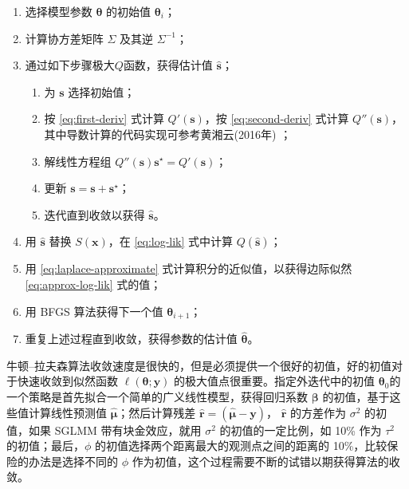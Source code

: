 \documentclass[12pt,a4paper,UTF8,twoside]{book}
\providecommand{\tightlist}{%
  \setlength{\itemsep}{0pt}\setlength{\parskip}{0pt}}
\theoremstyle{definition}
\theoremstyle{definition}
\theoremstyle{definition}
\theoremstyle{remark}
\begin{document}
\begin{enumerate}
\def\labelenumi{\arabic{enumi}.}
\tightlist
\item
  选择模型参数 \(\boldsymbol{\theta}\) 的初始值
  \(\boldsymbol{\theta}_{i}\)；
\item
  计算协方差矩阵 \(\Sigma\) 及其逆 \(\Sigma^{-1}\)；
\item
  通过如下步骤极大\(Q\)函数，获得估计值 \(\hat{\mathbf{s}}\)；

  \begin{enumerate}
  \def\labelenumii{(\alph{enumii})}
  \tightlist
  \item
    为 \(\mathbf{s}\) 选择初始值；
  \item
    按 \eqref{eq:first-deriv} 式计算 \(Q'(\mathbf{s})\)，按
    \eqref{eq:second-deriv} 式计算
    \(Q''(\mathbf{s})\)，其中导数计算的代码实现可参考黄湘云(2016年)
    \citep{Huang2016COS}；
  \item
    解线性方程组
    \(Q''(\mathbf{s})\mathbf{s}^{\star} = Q'(\mathbf{s})\)；
  \item
    更新 \(\mathbf{s = s + s^{\star}}\)；
  \item
    迭代直到收敛以获得 \(\hat{\mathbf{s}}\)。
  \end{enumerate}
\item
  用 \(\hat{\mathbf{s}}\) 替换 \(S(\mathbf{x})\)，在 \eqref{eq:log-lik}
  式中计算 \(Q(\hat{\mathbf{s}})\)；
\item
  用 \eqref{eq:laplace-approximate} 式计算积分的近似值，以获得边际似然
  \eqref{eq:approx-log-lik} 式的值；
\item
  用 BFGS 算法获得下一个值 \(\boldsymbol{\theta}_{i+1}\)；
\item
  重复上述过程直到收敛，获得参数的估计值 \(\hat{\boldsymbol{\theta}}\)。
\end{enumerate}

牛顿--拉夫森算法收敛速度是很快的，但是必须提供一个很好的初值，好的初值对于快速收敛到似然函数
\(\ell(\boldsymbol{\theta};\mathbf{y})\)
的极大值点很重要。指定外迭代中的初值
\(\boldsymbol{\theta}_{0}\)的一个策略是首先拟合一个简单的广义线性模型，获得回归系数
\(\boldsymbol{\beta}\) 的初值，基于这些值计算线性预测值
\(\hat{\boldsymbol{\mu}}\)；然后计算残差
\(\hat{\boldsymbol{r}} = (\hat{\boldsymbol{\mu}} - \mathbf{y})\)，
\(\hat{\boldsymbol{r}}\) 的方差作为 \(\sigma^2\) 的初值，如果 SGLMM
带有块金效应，就用 \(\sigma^2\) 的初值的一定比例，如 10\% 作为
\(\tau^2\) 的初值；最后，\(\phi\)
的初值选择两个距离最大的观测点之间的距离的
10\%，比较保险的办法是选择不同的 \(\phi\)
作为初值，这个过程需要不断的试错以期获得算法的收敛\citep{Bonat2016Practical}。
\end{document}
